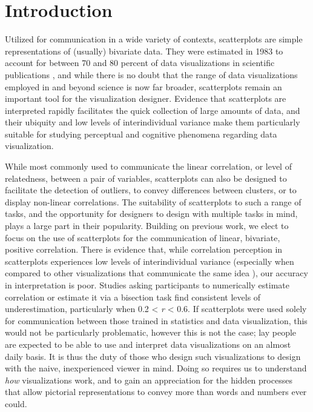 \documentclass[manuscript,screen,review,anonymous]{acmart}
\begin{document}
\setlength{\parskip}{-0.1pt}

\section{Introduction}\label{sec-intro}

Utilized for communication in a wide variety of contexts, scatterplots
are simple representations of (usually) bivariate data. They were
estimated in 1983 to account for between 70 and 80 percent of data
visualizations in scientific publications \citep{tufte_1983}, and while
there is no doubt that the range of data visualizations employed in and
beyond science is now far broader, scatterplots remain an important tool
for the visualization designer. Evidence that scatterplots are
interpreted rapidly \citep{rensink_2014} facilitates the quick
collection of large amounts of data, and their ubiquity
\citep{tufte_1983} and low levels of interindividual variance
\citep{kay_2015} make them particularly suitable for studying perceptual
and cognitive phenomena regarding data visualization.

While most commonly used to communicate the linear correlation, or level
of relatedness, between a pair of variables, scatterplots can also be
designed to facilitate the detection of outliers, to convey differences
between clusters, or to display non-linear correlations. The suitability
of scatterplots to such a range of tasks, and the opportunity for
designers to design with multiple tasks in mind, plays a large part in
their popularity. Building on previous work, we elect to focus on the
use of scatterplots for the communication of linear, bivariate, positive
correlation. There is evidence that, while correlation perception in
scatterplots experiences low levels of interindividual variance
(especially when compared to other visualizations that communicate the
same idea \citep{harrison_2014, kay_2015}), our accuracy in
interpretation is poor. Studies asking participants to numerically
estimate correlation
\citep{strahan_1978, bobko_1979, cleveland_1982, lane_1985, lauer_1989, collyer_1990, meyer_1992}
or estimate it via a bisection task \citep{rensink_2017} find consistent
levels of underestimation, particularly when 0.2 \textless{} \emph{r}
\textless{} 0.6. If scatterplots were used solely for communication
between those trained in statistics and data visualization, this would
not be particularly problematic, however this is not the case; lay
people are expected to be able to use and interpret data visualizations
on an almost daily basis. It is thus the duty of those who design such
visualizations to design with the naive, inexperienced viewer in mind.
Doing so requires us to understand \emph{how} visualizations work, and
to gain an appreciation for the hidden processes that allow pictorial
representations to convey more than words and numbers ever could.
\end{document}
